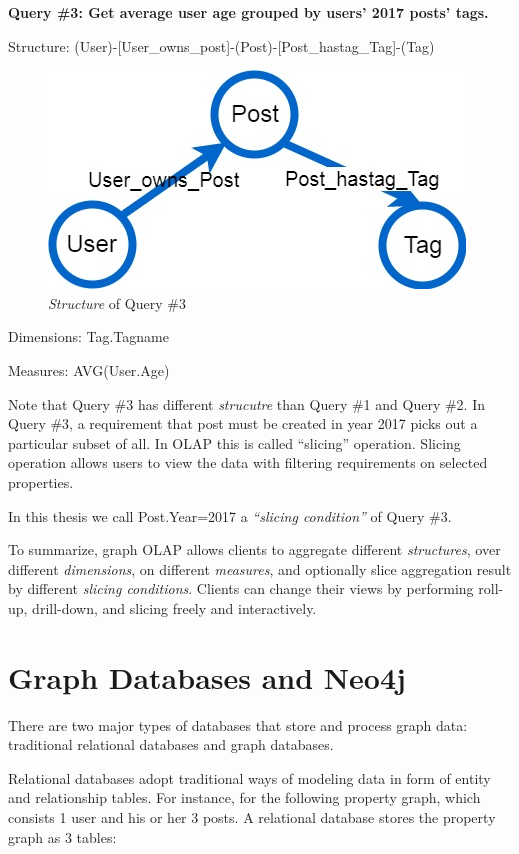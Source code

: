 \textbf{Query \#3: 		Get average user age grouped by users’ 2017 posts’ tags.} 

Structure:	(User)-[User\_owns\_post]-(Post)-[Post\_hastag\_Tag]-(Tag)
\begin {figure}[H]
\centering
\includegraphics[scale=0.5]{pic/meta2.jpg}
\caption{\textit{Structure} of Query \#3}
\end{figure}


Dimensions:	{Tag.Tagname}

Measures:	{AVG(User.Age)}
 
Note that Query \#3 has different \textit{strucutre} than Query \#1 and Query \#2. In Query \#3, a requirement that post must be created in year 2017 picks out a particular subset of  all. In OLAP this is called ``slicing'' operation. Slicing operation allows users to view the data with filtering requirements on selected properties. 
 
In this thesis we call {Post.Year=2017} a \textit{``slicing condition''} of Query \#3.
 
To summarize, graph OLAP allows clients to aggregate different \textit{structures}, over different \textit{dimensions}, on different \textit{measures}, and optionally slice aggregation result by different \textit{slicing conditions}. Clients can change their views by performing roll-up, drill-down, and slicing freely and interactively.


\section{Graph Databases and Neo4j}


There are two major types of databases that store and process graph data: traditional relational databases and graph databases. 
 
Relational databases adopt traditional ways of modeling data in form of entity and relationship tables. For instance, for the following property graph, which consists 1 user and his or her 3 posts. A relational database stores the property graph as 3 tables:

